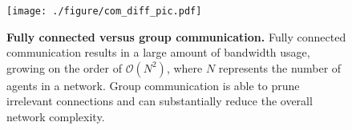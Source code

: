\begin{figure}[t]
    \vspace{1mm}
    \begin{center}
    \centerline{\texttt{[image: ./figure/com\_diff\_pic.pdf]}}
    \caption{
        \textbf{Fully connected versus group communication.} Fully connected communication results in a large amount of bandwidth usage, growing on the order of $\mathcal{O}(N^2)$, where $N$ represents the number of agents in a network. Group communication is able to prune irrelevant connections and can substantially reduce the overall network complexity.
        }
        \label{fig:com_diff}
    \end{center}
    \vspace{-6mm}
\end{figure}
